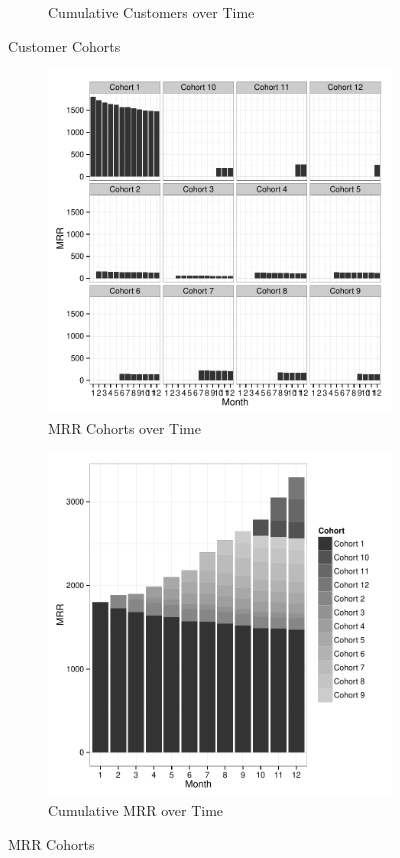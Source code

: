 \documentclass[11pt]{article}
\begin{document}
\begin{figure}
\begin{subfigure}{0.70\textwidth}
\caption{Cumulative Customers over Time}
\label{fig2}
\end{subfigure}
\caption{Customer Cohorts}
\label{fig5}
\end{figure}


\begin{figure}
\centering
\begin{subfigure}{0.70\textwidth}
\centering
\includegraphics{TaaS-013}
\caption{MRR Cohorts over Time}
\label{fig3}
\end{subfigure}
\begin{subfigure}{0.70\textwidth}
\centering
\includegraphics{TaaS-014}
\caption{Cumulative MRR over Time}
\label{fig4}
\end{subfigure}
\caption{MRR Cohorts}
\label{fig6}
\end{figure}
\end{document}
